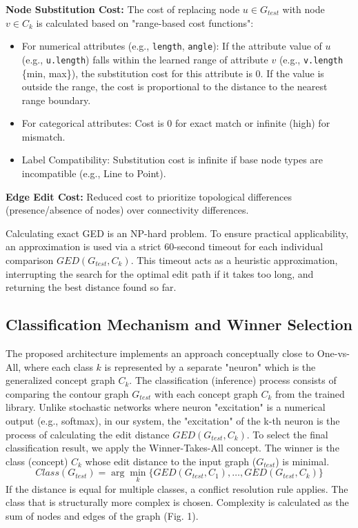 \documentclass[conference]{IEEEtran}
\begin{document}
\textbf{Node Substitution Cost:} The cost of replacing node $u \in G_{test}$ with node $v \in C_k$ is calculated based on "range-based cost functions":
\begin{itemize}
    \item For numerical attributes (e.g., \texttt{length}, \texttt{angle}): If the attribute value of $u$ (e.g., \texttt{u.length}) falls within the learned range of attribute $v$ (e.g., \texttt{v.length} \{min, max\}), the substitution cost for this attribute is 0. If the value is outside the range, the cost is proportional to the distance to the nearest range boundary.
    \item For categorical attributes: Cost is 0 for exact match or infinite (high) for mismatch.
    \item Label Compatibility: Substitution cost is infinite if base node types are incompatible (e.g., Line to Point).
\end{itemize}

\textbf{Edge Edit Cost:} Reduced cost to prioritize topological differences (presence/absence of nodes) over connectivity differences.

Calculating exact GED is an NP-hard problem. To ensure practical applicability, an approximation is used via a strict 60-second timeout for each individual comparison $GED(G_{test}, C_k)$. This timeout acts as a heuristic approximation, interrupting the search for the optimal edit path if it takes too long, and returning the best distance found so far.

\subsection{Classification Mechanism and Winner Selection}
The proposed architecture implements an approach conceptually close to One-vs-All, where each class $k$ is represented by a separate "neuron" which is the generalized concept graph $C_k$. The classification (inference) process consists of comparing the contour graph $G_{test}$ with each concept graph $C_k$ from the trained library. Unlike stochastic networks where neuron "excitation" is a numerical output (e.g., softmax), in our system, the "excitation" of the k-th neuron is the process of calculating the edit distance $GED(G_{test}, C_k)$. To select the final classification result, we apply the Winner-Takes-All concept. The winner is the class (concept) $C_k$ whose edit distance to the input graph ($G_{test}$) is minimal.
\[
Class(G_{test}) = \arg\min_{k} \{GED(G_{test}, C_1), \dots, GED(G_{test}, C_k)\}
\]
If the distance is equal for multiple classes, a conflict resolution rule applies. The class that is structurally more complex is chosen. Complexity is calculated as the sum of nodes and edges of the graph (Fig. 1).
\end{document}
